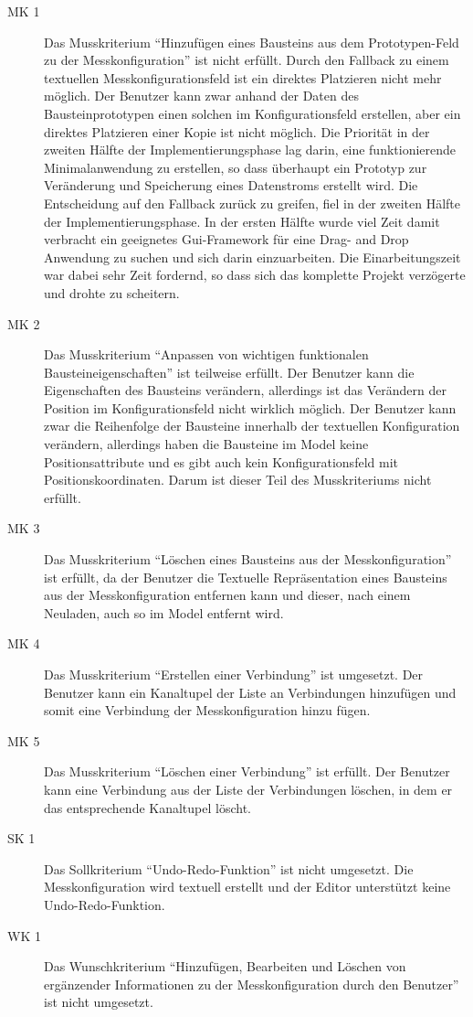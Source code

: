 \documentclass[parskip=full]{scrartcl}
\begin{document}
\begin{description}
\item[MK 1] Das Musskriterium "`Hinzufügen eines Bausteins aus dem Prototypen-Feld zu der Messkonfiguration"' ist nicht erfüllt. Durch den Fallback zu einem textuellen Messkonfigurationsfeld ist ein direktes Platzieren nicht mehr möglich. Der Benutzer kann zwar anhand der Daten des Bausteinprototypen einen solchen im Konfigurationsfeld erstellen, aber ein direktes Platzieren einer Kopie ist nicht möglich. Die Priorität in der zweiten Hälfte der Implementierungsphase lag darin, eine funktionierende Minimalanwendung zu erstellen, so dass überhaupt ein Prototyp zur Veränderung und Speicherung eines Datenstroms erstellt wird. Die Entscheidung auf den Fallback zurück zu greifen, fiel in der zweiten Hälfte der Implementierungsphase. In der ersten Hälfte wurde viel Zeit damit verbracht ein geeignetes Gui-Framework für eine Drag- and Drop Anwendung zu suchen und sich darin einzuarbeiten. Die Einarbeitungszeit war dabei sehr Zeit fordernd, so dass sich das komplette Projekt verzögerte und drohte zu scheitern.
\item[MK 2] Das Musskriterium "`Anpassen von wichtigen funktionalen Bausteineigenschaften"' ist teilweise erfüllt. Der Benutzer kann die Eigenschaften des Bausteins verändern, allerdings ist das Verändern der Position im Konfigurationsfeld nicht wirklich möglich. Der Benutzer kann zwar die Reihenfolge der Bausteine innerhalb der textuellen Konfiguration verändern, allerdings haben die Bausteine im Model keine Positionsattribute und es gibt auch kein Konfigurationsfeld mit Positionskoordinaten. Darum ist dieser Teil des Musskriteriums nicht erfüllt. 
\item[MK 3] Das Musskriterium "`Löschen eines Bausteins aus der Messkonfiguration"' ist erfüllt, da der Benutzer die Textuelle Repräsentation eines Bausteins aus der Messkonfiguration entfernen kann und dieser, nach einem Neuladen, auch so im Model entfernt wird.
\item[MK 4] Das Musskriterium "`Erstellen einer Verbindung"' ist umgesetzt. Der Benutzer kann ein Kanaltupel der Liste an Verbindungen hinzufügen und somit eine Verbindung der Messkonfiguration hinzu fügen. 
\item[MK 5] Das Musskriterium "`Löschen einer Verbindung"' ist erfüllt. Der Benutzer kann eine Verbindung aus der Liste der Verbindungen löschen, in dem er das entsprechende Kanaltupel löscht.
\item[SK 1] Das Sollkriterium "`Undo-Redo-Funktion"' ist nicht umgesetzt. Die Messkonfiguration wird textuell erstellt und der Editor unterstützt keine Undo-Redo-Funktion. 
\item[WK 1] Das Wunschkriterium "`Hinzufügen, Bearbeiten und Löschen von ergänzender Informationen zu der Messkonfiguration durch den Benutzer"' ist nicht umgesetzt.
\end{description}
\end{document}
